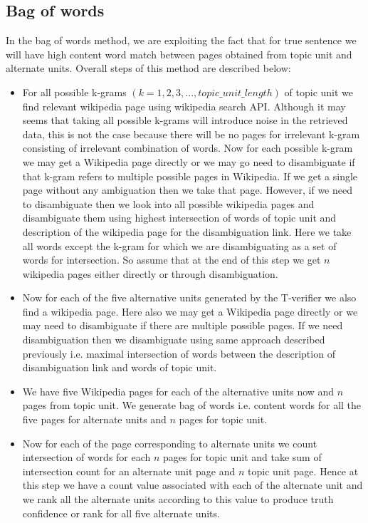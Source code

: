 \documentclass[11pt]{article}
\begin{document}
\subsection{Bag of words}
In the bag of words method, we are exploiting the fact that for true sentence we will have high content word match between pages obtained from topic unit and alternate units. Overall steps of this method are described below:
\begin{itemize}
\item For all possible k-grams $(k=1,2,3,...,topic\_unit\_length)$ of topic unit we find relevant wikipedia page using wikipedia search API. Although it may seems that taking all possible k-grams will introduce noise in the retrieved data, this is not the case because there will be no pages for irrelevant k-gram consisting of irrelevant combination of words. Now for each possible k-gram we may get a Wikipedia page directly or we may go need to disambiguate if that k-gram refers to multiple possible pages in Wikipedia. If we get a single page without any ambiguation then we take that page. However, if we need to disambiguate then we look into all possible wikipedia pages and disambiguate them using highest intersection of words of topic unit and description of the wikipedia page for the disambiguation link. Here we take all words except the k-gram for which we are disambiguating as a set of words for intersection. So assume that at the end of this step we get $n$ wikipedia pages either directly or through disambiguation.

\item Now for each of the five alternative units generated by the T-verifier we also find a wikipedia page. Here also we may get a Wikipedia page directly or we may need to disambiguate if there are multiple possible pages. If we need disambiguation then we disambiguate using same approach described previously i.e. maximal intersection of words between the description of disambiguation link and words of topic unit.

\item We have five Wikipedia pages for each of the alternative units now and $n$ pages from topic unit. We generate bag of words i.e. content words for all the five pages for alternate units and $n$ pages for topic unit.

\item Now for each of the page corresponding to alternate units we count intersection of words for each $n$ pages for topic unit and take sum of  intersection count for an alternate unit page and $n$ topic unit page. Hence at this step we have a count value associated with each of the alternate unit and we rank all the alternate units according to this value to produce truth confidence or rank for all five alternate units.
\end{itemize}
\end{document}
